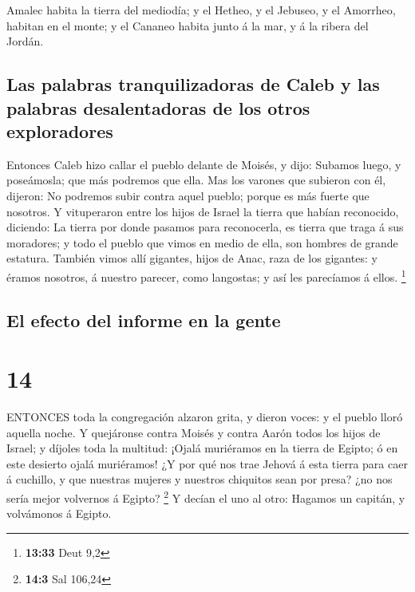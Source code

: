  Amalec habita la tierra del mediodía; y el Hetheo, y el
Jebuseo, y el Amorrheo, habitan en el monte; y el Cananeo habita junto á
la mar, y á la ribera del Jordán.

\hypertarget{las-palabras-tranquilizadoras-de-caleb-y-las-palabras-desalentadoras-de-los-otros-exploradores}{%
\subsection{Las palabras tranquilizadoras de Caleb y las palabras
desalentadoras de los otros
exploradores}\label{las-palabras-tranquilizadoras-de-caleb-y-las-palabras-desalentadoras-de-los-otros-exploradores}}

 Entonces Caleb hizo callar el pueblo delante de Moisés, y
dijo: Subamos luego, y poseámosla; que más podremos que ella.
 Mas los varones que subieron con él, dijeron: No podremos
subir contra aquel pueblo; porque es más fuerte que nosotros.
 Y vituperaron entre los hijos de Israel la tierra que
habían reconocido, diciendo: La tierra por donde pasamos para
reconocerla, es tierra que traga á sus moradores; y todo el pueblo que
vimos en medio de ella, son hombres de grande estatura. También vimos
allí gigantes, hijos de Anac, raza de los gigantes: y éramos nosotros, á
nuestro parecer, como langostas; y así les parecíamos á ellos.
\footnote{\textbf{13:33} Deut 9,2}

\hypertarget{el-efecto-del-informe-en-la-gente}{%
\subsection{El efecto del informe en la
gente}\label{el-efecto-del-informe-en-la-gente}}

\hypertarget{section-13}{%
\section{14}\label{section-13}}

 ENTONCES toda la congregación alzaron grita, y dieron
voces: y el pueblo lloró aquella noche.  Y quejáronse contra
Moisés y contra Aarón todos los hijos de Israel; y díjoles toda la
multitud: ¡Ojalá muriéramos en la tierra de Egipto; ó en este desierto
ojalá muriéramos!  ¿Y por qué nos trae Jehová á esta tierra
para caer á cuchillo, y que nuestras mujeres y nuestros chiquitos sean
por presa? ¿no nos sería mejor volvernos á Egipto? \footnote{\textbf{14:3}
  Sal 106,24}  Y decían el uno al otro: Hagamos un capitán,
y volvámonos á Egipto.

